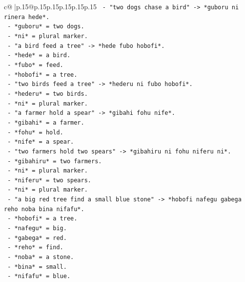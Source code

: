 \documentclass{article}
\begin{document}
{\begin{supertabular}{c@{$\;$}|p{.15\linewidth}@{}p{.15\linewidth}p{.15\linewidth}p{.15\linewidth}p{.15\linewidth}p{.15\linewidth}}
{{{\texttt{            {-} "two dogs chase a bird" {-}> *guboru ni rinera hede*.} \\
\texttt{              {-} *guboru* = two dogs.} \\
\texttt{              {-} *ni* = plural marker.} \\
\texttt{            {-} "a bird feed a tree" {-}> *hede fubo hobofi*.} \\
\texttt{              {-} *hede* = a bird.} \\
\texttt{              {-} *fubo* = feed.} \\
\texttt{              {-} *hobofi* = a tree.} \\
\texttt{            {-} "two birds feed a tree" {-}> *hederu ni fubo hobofi*.} \\
\texttt{              {-} *hederu* = two birds.} \\
\texttt{              {-} *ni* = plural marker.} \\
\texttt{            {-} "a farmer hold a spear" {-}> *gibahi fohu nife*.} \\
\texttt{              {-} *gibahi* = a farmer.} \\
\texttt{              {-} *fohu* = hold.} \\
\texttt{              {-} *nife* = a spear.} \\
\texttt{            {-} "two farmers hold two spears" {-}> *gibahiru ni fohu niferu ni*.} \\
\texttt{              {-} *gibahiru* = two farmers.} \\
\texttt{              {-} *ni* = plural marker.} \\
\texttt{              {-} *niferu* = two spears.} \\
\texttt{              {-} *ni* = plural marker.} \\
\texttt{            {-} "a big red tree find a small blue stone" {-}> *hobofi nafegu gabega reho noba bina nifafu*.} \\
\texttt{              {-} *hobofi* = a tree.} \\
\texttt{              {-} *nafegu* = big.} \\
\texttt{              {-} *gabega* = red.} \\
\texttt{              {-} *reho* = find.} \\
\texttt{              {-} *noba* = a stone.} \\
\texttt{              {-} *bina* = small.} \\
\texttt{              {-} *nifafu* = blue.} \\
}}}
\end{supertabular}}
\end{document}
